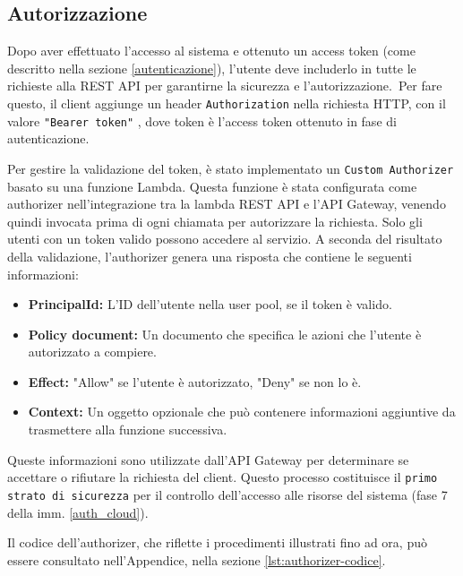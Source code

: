 \FloatBarrier


\subsection{Autorizzazione}

\label{authorizer}
Dopo aver effettuato l'accesso al sistema e ottenuto un access token (come descritto nella sezione \ref{autenticazione}), l'utente deve includerlo in tutte le richieste alla REST API per garantirne la sicurezza e l'autorizzazione.\
Per fare questo, il client aggiunge un header \texttt{Authorization} nella richiesta HTTP, con il valore \texttt{"Bearer {token}"} \cite{rfc6750}, dove {token} è l'access token ottenuto in fase di autenticazione.

\vspace{0,3cm}
Per gestire la validazione del token, è stato implementato un \texttt{Custom Authorizer} basato su una funzione Lambda. Questa funzione è stata configurata come authorizer nell'integrazione tra la lambda REST API e l'API Gateway, venendo quindi invocata prima di ogni chiamata per autorizzare la richiesta. Solo gli utenti con un token valido possono accedere al servizio. A seconda del risultato della validazione, l'authorizer genera una risposta che contiene le seguenti informazioni:

\begin{itemize}
    \item \textbf{PrincipalId:} L'ID dell'utente nella user pool, se il token è valido.
    \item \textbf{Policy document:} Un documento che specifica le azioni che l'utente è autorizzato a compiere.
    \item \textbf{Effect:} "Allow" se l'utente è autorizzato, "Deny" se non lo è.
    \item \textbf{Context:} Un oggetto opzionale che può contenere informazioni aggiuntive da trasmettere alla funzione successiva.
\end{itemize}
Queste informazioni sono utilizzate dall'API Gateway per determinare se accettare o rifiutare la richiesta del client. Questo processo costituisce il \texttt{primo strato di sicurezza} per il controllo dell'accesso alle risorse del sistema (fase 7 della imm. \ref{auth_cloud}).

Il codice dell'authorizer, che riflette i procedimenti illustrati fino ad ora, può essere consultato nell'Appendice, nella sezione \ref{lst:authorizer-codice}.

\vspace{0,3cm}

